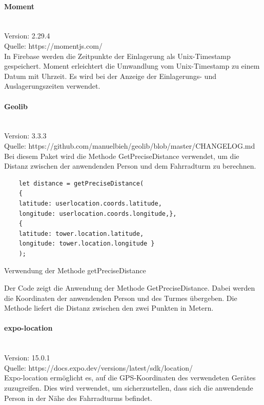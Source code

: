 \bigskip

\paragraph{Moment}\mbox{}\\
Version: 2.29.4\\
Quelle: https://momentjs.com/\\
In Firebase werden die Zeitpunkte der Einlagerung als \Gls{Unix-Timestamp} gespeichert. Moment erleichtert die Umwandlung vom \Gls{Unix-Timestamp} zu einem Datum mit Uhrzeit. Es wird bei der Anzeige der Einlagerungs- und Auslagerungszeiten verwendet.

\bigskip

\paragraph{Geolib}\mbox{}\\
Version: 3.3.3\\
Quelle: https://github.com/manuelbieh/geolib/blob/master/CHANGELOG.md\\
Bei diesem Paket wird die Methode GetPreciseDistance verwendet, um die Distanz zwischen der anwendenden Person und dem Fahrradturm zu berechnen.
\begin{listing}[H]
  \begin{verbatim}
    let distance = getPreciseDistance(
    {
    latitude: userlocation.coords.latitude,
    longitude: userlocation.coords.longitude,},
    { 
    latitude: tower.location.latitude, 
    longitude: tower.location.longitude }
    );
\end{verbatim}
  \caption{Verwendung der Methode getPreciseDistance}
  \label{lst:getprecisedistance}
\end{listing}
Der Code zeigt die Anwendung der Methode GetPreciseDistance. Dabei werden die Koordinaten der anwendenden Person und des Turmes übergeben. Die Methode liefert die Distanz zwischen den zwei Punkten in Metern.

\bigskip

\paragraph{expo-location}\mbox{}\\
Version: 15.0.1\\
Quelle: https://docs.expo.dev/versions/latest/sdk/location/\\
Expo-location ermöglicht es, auf die GPS-Koordinaten des verwendeten Gerätes zuzugreifen. Dies wird verwendet, um sicherzustellen, dass sich die anwendende Person in der Nähe des Fahrradturms befindet.

